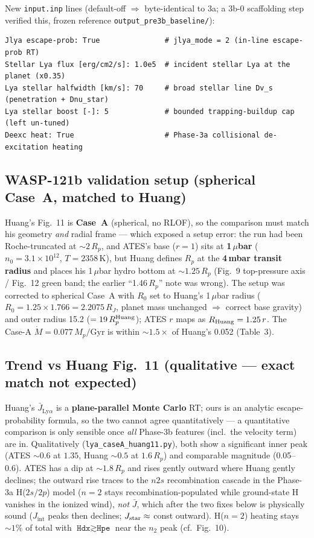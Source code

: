 \documentclass[english,a4paper]{kiseon_memo}
\begin{document}
New \texttt{input.inp} lines (default-off \(\Rightarrow\) byte-identical to 3a; a
3b-0 scaffolding step verified this, frozen reference
\texttt{output\_pre3b\_baseline/}):
\begin{verbatim}
Jlya escape-prob: True               # jlya_mode = 2 (in-line escape-prob RT)
Stellar Lya flux [erg/cm2/s]: 1.0e5  # incident stellar Lya at the planet (x0.35)
Lya stellar halfwidth [km/s]: 70     # broad stellar line Dv_s (penetration + Dnu_star)
Lya stellar boost [-]: 5             # bounded trapping-buildup cap (left un-tuned)
Deexc heat: True                     # Phase-3a collisional de-excitation heating
\end{verbatim}

\subsection{WASP-121b validation setup (spherical Case~A, matched to Huang)}
Huang's Fig.~11 is \textbf{Case~A} (spherical, no RLOF), so the comparison must match
his geometry \emph{and} radial frame --- which exposed a setup error: the run had
been Roche-truncated at \(\sim2\,R_p\), and ATES's base (\(r{=}1\)) sits at
\textbf{1\,\(\mu\)bar} (\(n_0=3.1\times10^{12}\), \(T=2358\,\mathrm K\)), but Huang
defines \(R_p\) at the \textbf{4\,mbar transit radius} and places his 1\,\(\mu\)bar
hydro bottom at \(\sim1.25\,R_p\) (Fig.~9 top-pressure axis / Fig.~12 green band; the
earlier ``1.46\,\(R_p\)'' note was wrong). The setup was corrected to spherical
Case~A with \(R_0\) set to Huang's 1\,\(\mu\)bar radius
(\(R_0=1.25\times1.766=2.2075\,R_J\), planet mass unchanged \(\Rightarrow\) correct
base gravity) and outer radius 15.2 (\(=19\,R_p^{\rm Huang}\)); ATES \(r\) maps as
\(R_{\rm Huang}=1.25\,r\). The Case-A \(\dot M=0.077\,M_p/\mathrm{Gyr}\) is within
\(\sim1.5\times\) of Huang's 0.052 (Table~3).

\subsection{Trend vs Huang Fig.~11 (qualitative --- exact match not expected)}
Huang's \(\bar J_{\mathrm{Ly}\alpha}\) is a \textbf{plane-parallel Monte Carlo} RT;
ours is an analytic escape-probability formula, so the two cannot agree
quantitatively --- a quantitative comparison is only sensible once \emph{all}
Phase-3b features (incl.\ the velocity term) are in. Qualitatively
(\texttt{lya\_caseA\_huang11.py}), both show a significant inner peak (ATES
\(\sim0.6\) at \(1.35\), Huang \(\sim0.5\) at \(1.6\,R_p\)) and comparable magnitude
(0.05--0.6). ATES has a dip at \(\sim1.8\,R_p\) and rises gently outward where Huang
gently declines; the outward rise traces to the \(n2s\) recombination cascade in the
Phase-3a H(\(2s/2p\)) model (\(n{=}2\) stays recombination-populated while
ground-state H vanishes in the ionized wind), \emph{not} \(\bar J\), which after the
two fixes below is physically sound (\(J_{\mathrm{int}}\) peaks then declines;
\(J_{\rm star}\approx\) const outward). H(\(n{=}2\)) heating stays \(\sim1\%\) of
total with \(\texttt{Hdx}\gtrsim\texttt{Hpe}\) near the \(n_2\) peak (cf.\ Fig.~10).
\end{document}

